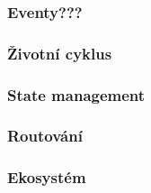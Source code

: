 \subsubsection{Eventy???}
\subsubsection{Životní cyklus}
\subsubsection{State management}
\subsubsection{Routování}
\subsubsection{Ekosystém}